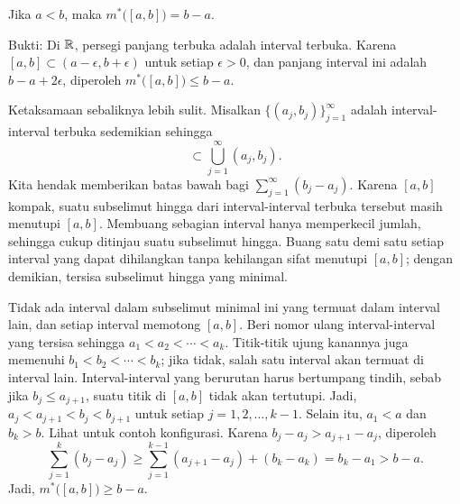 \begin{example}
Jika $a < b$, maka $m^*\bigl([a,b]\bigr) = b-a$.

Bukti:
Di ${\mathbb{R}}$, persegi panjang terbuka adalah interval terbuka. Karena
$[a,b]\subset(a-\epsilon,b+\epsilon)$ untuk setiap $\epsilon>0$, dan panjang
interval ini adalah $b-a+2\epsilon$, diperoleh
$m^*\bigl([a,b]\bigr)\leq b-a$.

Ketaksamaan sebaliknya lebih sulit. Misalkan
$\bigl\{(a_j,b_j)\bigr\}_{j=1}^\infty$ adalah interval-interval terbuka
sedemikian sehingga
\begin{equation*}
[a,b] \subset \bigcup_{j=1}^\infty (a_j,b_j) .
\end{equation*}
Kita hendak memberikan batas bawah bagi
$\sum_{j=1}^\infty(b_j-a_j)$. Karena $[a,b]$ kompak, suatu subselimut hingga
dari interval-interval terbuka tersebut masih menutupi $[a,b]$. Membuang
sebagian interval hanya memperkecil jumlah, sehingga cukup ditinjau suatu
subselimut hingga. Buang satu demi satu setiap interval yang dapat dihilangkan
tanpa kehilangan sifat menutupi $[a,b]$; dengan demikian, tersisa subselimut
hingga yang minimal.

Tidak ada interval dalam subselimut minimal ini yang termuat dalam interval lain,
dan setiap interval memotong $[a,b]$. Beri nomor ulang interval-interval yang
tersisa sehingga
$a_1<a_2<\cdots<a_k$. Titik-titik ujung kanannya juga memenuhi
$b_1<b_2<\cdots<b_k$; jika tidak, salah satu interval akan termuat di interval
lain. Interval-interval yang berurutan harus bertumpang tindih, sebab jika
$b_j\leq a_{j+1}$, suatu titik di $[a,b]$ tidak akan tertutupi. Jadi,
$a_j<a_{j+1}<b_j<b_{j+1}$ untuk setiap $j=1,2,\ldots,k-1$. Selain itu,
$a_1<a$ dan $b_k>b$. Lihat  untuk contoh
konfigurasi. Karena $b_j-a_j>a_{j+1}-a_j$, diperoleh
\begin{equation*}
\sum_{j=1}^k (b_j-a_j)
\geq
\sum_{j=1}^{k-1} (a_{j+1}-a_j)
+
(b_k-a_k)
=
b_k-a_1 > b-a .
\end{equation*}
Jadi, $m^*\bigl([a,b]\bigr)\geq b-a$.
\begin{myfigureht}
\caption{Interval-interval terbuka yang menutupi $[a,b]$ dan memenuhi
$a_j<a_{j+1}<b_j<b_{j+1}$ untuk $j=1,2,\ldots,k-1$.
\label{fig:measureinterval}}
\end{myfigureht}
\end{example}

